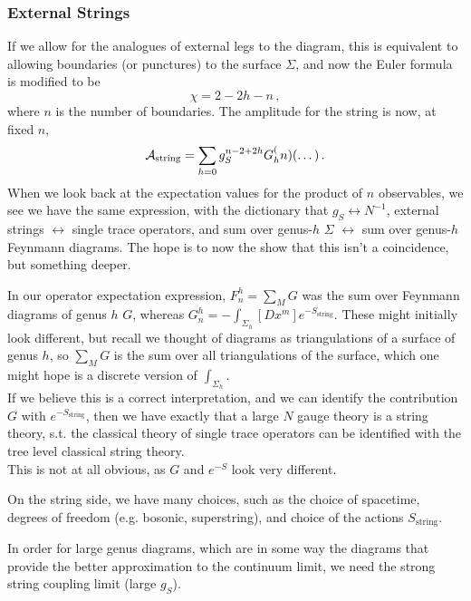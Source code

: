 \documentclass{article}
\begin{document}
\subsubsection{External Strings}
If we allow for the analogues of external legs to the diagram, this is equivalent to allowing boundaries (or punctures) to the surface $\Sigma$, and now the Euler formula is modified to be 
\[
\chi = 2-2h-n \, , 
\] 
where $n$ is the number of boundaries. The amplitude for the string is now, at fixed $n$,
\[
\mathcal{A}_{\text{string}} = \sum_{h = 0} g_S^{n-2+2h} G_h^(n)(\dots) \, .
\]
When we look back at the expectation values for the product of $n$ observables, we see we have the same expression, with the dictionary that $g_S \leftrightarrow N^{-1}$, external strings $\leftrightarrow$ single trace operators, and sum over genus-$h$ $\Sigma$ $\leftrightarrow$ sum over genus-$h$ Feynmann diagrams. The hope is  to now the show that this isn't a coincidence, but something deeper. 
\begin{remark}
	In our operator expectation expression, $F_n^h = \sum_M G$ was the sum over Feynmann diagrams of genus $h$ $G$, whereas $G_n^h = -\int_{\Sigma_h} [Dx^m] e^{-S_{\text{string}}}$. These might initially look different, but recall we thought of diagrams as triangulations of a surface of genus $h$, so $\sum_M G$ is the sum over all triangulations of the surface, which one might hope is a discrete version of $\int_{\Sigma_h}$. \\
	If we believe this is a correct interpretation, and we can identify the contribution $G$ with $e^{-S_\text{string}}$, then we have exactly that a large $N$ gauge theory is a string theory, s.t. the classical theory of single trace operators can be identified with the tree level classical string theory. \\
	This is not at all obvious, as $G$ and $e^{-S}$ look very different. 
\end{remark}

\begin{remark}
	On the string side, we have many choices, such as the choice of spacetime, degrees of freedom (e.g. bosonic, superstring), and choice of the actions $S_{\text{string}}$. 
\end{remark}

\begin{remark}
	In order for large genus diagrams, which are in some way the diagrams that provide the better approximation to the continuum limit, we need the strong string coupling limit (large $g_S$).  
\end{remark}
\end{document}
